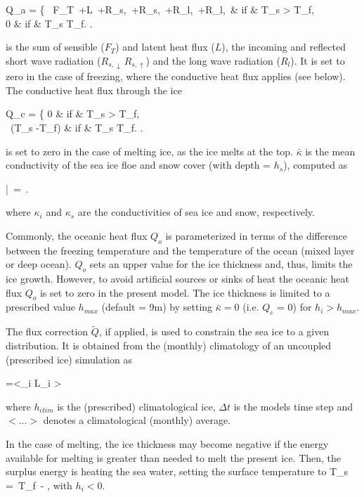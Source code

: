 \be
Q_a = \left\{ 
\, F_T\, +L\, +R_{s,\downarrow}\, +R_{s,\uparrow}\,
	+R_{l,\downarrow}\, +R_{l,\uparrow}\, & {\rm if} & T_s > T_f, \\
0 & {\rm if} &  T_s \le T_f.
\ea \right. \label{qa_eq}
\ee

is the sum of sensible ($F_T$) and latent heat flux ($L$), the incoming and
reflected short wave radiation ($R_{s,\downarrow}\, R_{s,\uparrow}$)
and the long wave radiation ($R_l$). It is set to zero in the case of freezing,
where the conductive heat flux applies (see below).
The conductive heat flux through the ice

\be
Q_c = \left\{ 
0 & {\rm if} & T_s > T_f, \\
{\di {}\, (T_s -T_f)} & {\rm if} &  T_s \le T_f.
\ea \right. \label{qc_eq}
\ee

is set to zero in the case of melting ice, as the ice melts at the top.
 $\bar{\kappa}$ is the mean conductivity
 of the sea ice floe and snow cover (with depth = $h_s$), computed as

\be 
{\di \bar{\kappa}\, =\, }.
\label{eq_kap}
\ee

where $\kappa_i$ and $\kappa_s$ are the conductivities of sea ice and snow, respectively.

Commonly, the oceanic heat flux $Q_o$ is parameterized in terms 
of the difference between the freezing temperature and the temperature 
of the ocean (mixed layer or deep ocean). $Q_o$ sets an upper value for 
the ice thickness and, thus, limits the ice growth.  However, to avoid 
artificial sources or sinks of heat the oceanic heat flux $Q_o$ is set 
to zero in the present model. The ice thickness is limited to a prescribed 
value $h_{max}$ (default = 9m) by setting $\bar{\kappa} = 0$ 
(i.e. $Q_c$ = 0) for $h_i > h_{max}$. 

The flux correction $\tilde{Q}$, if applied, is used to  
constrain the sea ice to a given distribution. 
It is obtained from the (monthly) climatology of an uncoupled 
(prescribed ice) simulation as

\be
{}=<\rho_i L_i >
\ee

where  $h_{clim}$ is the (prescribed) climatological ice, $\Delta t$ 
is the models time step and $<...>$ denotes a climatological (monthly) average.

In the case of melting, the ice thickness may become negative if the 
energy available for melting is greater than needed to
 melt the present ice. Then, the surplus energy is heating the
 sea water, setting the surface temperature to
\be
{\di T_s\, =\, T_f\, - },
\ee
with $h_i < 0$.

